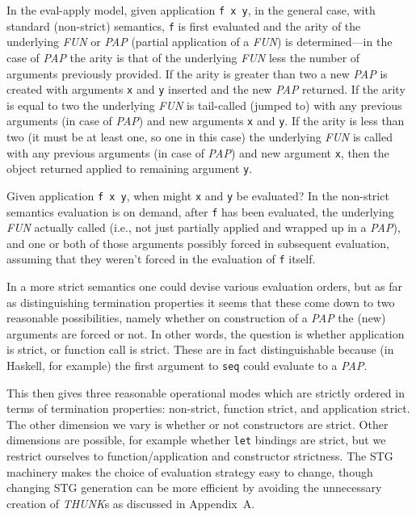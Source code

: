 \documentclass{llncs}
\begin{document}
In the eval-apply model, given application \texttt{f x y}, in the general case, with standard
(non-strict) semantics, \texttt{f} is first evaluated and the
arity of the underlying \emph{FUN} or \emph{PAP} (partial application of a
\emph{FUN}) is determined---in the case of \emph{PAP} the arity is that of the
underlying \emph{FUN} less the number of arguments previously provided.  If
the arity is greater than two a new \emph{PAP} is created with arguments
\texttt{x} and \texttt{y} inserted and the new \emph{PAP} returned.  If the
arity is equal to two the underlying \emph{FUN} is tail-called (jumped to)
with any previous arguments (in case of \emph{PAP}) and new arguments
\texttt{x} and \texttt{y}.  If the arity is less than two (it must be at least
one, so one in this case) the underlying \emph{FUN} is called with any
previous arguments (in case of \emph{PAP}) and new argument \texttt{x}, then
the object returned applied to remaining argument \texttt{y}.

Given application \texttt{f x y}, when might \texttt{x} and \texttt{y} be
evaluated?  In the non-strict semantics evaluation is on demand, after
\texttt{f} has been evaluated, the underlying \emph{FUN} actually called
(i.e., not just partially applied and wrapped up in a \emph{PAP}), and one or
both of those arguments possibly forced in subsequent evaluation, assuming
that they weren't forced in the evaluation of \texttt{f} itself.

In a more strict semantics one could devise various evaluation orders, but as far
as distinguishing termination properties it seems that these come
down to two reasonable possibilities, namely whether on construction of a
\emph{PAP} the (new) arguments are forced or not.  In other words, the
question is whether application is strict, or function call is strict.  These
are in fact distinguishable because (in Haskell, for example) the first
argument to \texttt{seq} could evaluate to a \emph{PAP}.

This then gives three reasonable operational modes which are strictly ordered
in terms of termination properties: 
non-strict, function strict, and application strict.
The other dimension we vary is whether or not constructors are strict.  Other
dimensions are possible, for example whether \texttt{let} bindings are strict,
but we restrict ourselves to function/application and constructor strictness.
The STG machinery makes the choice of evaluation strategy easy to change,
though changing STG generation can be more efficient by avoiding the
unnecessary creation of \emph{THUNK}s as discussed in Appendix~A.
\end{document}
